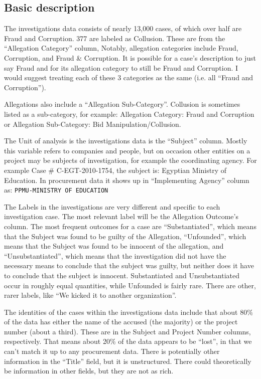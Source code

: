 \subsection{Basic description}

The investigations data consists of nearly 13,000 cases, of which over half are Fraud and Corruption. 377 are labeled as Collusion. These are from the ``Allegation Category'' column, Notably, allegation categories include Fraud, Corruption, and Fraud \& Corruption. It is possible for a case's description to just say Fraud and for its allegation category to still be Fraud and Corruption. I would suggest treating each of these 3 categories as the same (i.e. all ``Fraud and Corruption'').

Allegations also include a ``Allegation Sub-Category''. Collusion is sometimes listed as a sub-category, for example: Allegation Category: Fraud and Corruption or Allegation Sub-Category: Bid Manipulation/Collusion.

The Unit of analysis is the investigations data is the ``Subject'' column. Mostly this variable refers to companies and people, but on occasion other entities on a project may be subjects of investigation, for example the coordinating agency. For example Case \# C-EGT-2010-1754, the subject is: Egyptian Ministry of Education. In procurement data it shows up in ``Implementing Agency'' column as: \texttt{PPMU-MINISTRY OF EDUCATION}
    
The Labels in the investigations are very different and specific to each investigation case. The most relevant label will be the Allegation Outcome's column. The most frequent outcomes for a case are ``Substantiated'', which means that the Subject was found to be guilty of the Allegation, ``Unfounded'', which means that the Subject was found to be  innocent of the allegation, and ``Unsubstantiated'', which means that the investigation did not have the necessary means to conclude that the subject was  guilty, but neither does it have to conclude that the subject is innocent. Substantiated and Unsubstantiated occur in roughly equal quantities, while Unfounded is fairly rare. There are other, rarer labels, like ``We kicked it to another organization''.

The identities of the cases within the investigations data include that about 80\% of the data has either the name of the accused (the majority) or the project number (about a third). These are in the Subject and Project Number columns, respectively. That means about 20\% of the data appears to be ``lost'', in that we can't match it up to any procurement data. There is potentially other information in the ``Title'' field, but it is unstructured. There could theoretically be information in other fields, but they are not as rich.


